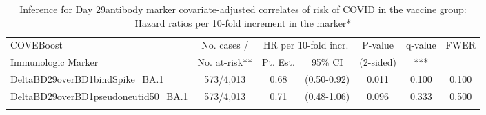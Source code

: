 \begin{longtable}{lcccccc}
\caption{Inference for Day 29antibody marker covariate-adjusted correlates of risk of COVID in the vaccine group: Hazard ratios per 10-fold increment in the marker*} \\ 
   \hline
 
         \multicolumn{1}{l}{COVEBoost} & \multicolumn{1}{c}{No. cases /}   & \multicolumn{2}{c}{HR per 10-fold incr.}                     & \multicolumn{1}{c}{P-value}   & \multicolumn{1}{c}{q-value}   & \multicolumn{1}{c}{FWER} \\ 
         \multicolumn{1}{l}{Immunologic Marker}            & \multicolumn{1}{c}{No. at-risk**} & \multicolumn{1}{c}{Pt. Est.} & \multicolumn{1}{c}{95\% CI} & \multicolumn{1}{c}{(2-sided)} & \multicolumn{1}{c}{***} & \multicolumn{1}{c}{} \\ 
         \hline
 
    DeltaBD29overBD1bindSpike\_BA.1 & 573/4,013 & 0.68 & (0.50-0.92) & 0.011 & 0.100 & 0.100 \\ 
  DeltaBD29overBD1pseudoneutid50\_BA.1 & 573/4,013 & 0.71 & (0.48-1.06) & 0.096 & 0.333 & 0.500 \\ 
   \hline
\hline
\label{tab:CoR_univariable_svycoxph_pretty}
\end{longtable}
